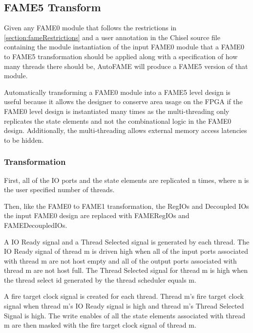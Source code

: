 \subsection{FAME5 Transform}
Given any FAME0 module that follows the restrictions in \ref{section:fameRestrictions} and a user annotation in the Chisel source file containing the module instantiation of the input FAME0 module that a FAME0 to FAME5 transformation should be applied along with a specification of how many threads there should be, AutoFAME will produce a FAME5 version of that module.

Automatically transforming a FAME0 module into a FAME5 level design is useful because it allows the designer to conserve area usage on the FPGA if the FAME0 level design is instantiated many times as the multi-threading only replicates the state elements and not the combinational logic in the FAME0 design. Additionally, the multi-threading allows external memory access latencies to be hidden.

\subsubsection{Transformation}
First, all of the IO ports and the state elements are replicated n times, where n is the user specified number of threads.

Then, like the FAME0 to FAME1 transformation, the RegIOs and Decoupled IOs the input FAME0 design are replaced with FAMERegIOs and FAMEDecoupledIOs.

A IO Ready signal and a Thread Selected signal is generated by each thread. The IO Ready signal of thread m is driven high when all of the input ports associated with thread m are not host empty and all of the output ports associated with thread m are not host full. The Thread Selected signal for thread m is high when the thread select id generated by the thread scheduler equals m.

A fire target clock signal is created for each thread. Thread m's fire target clock signal when thread m's IO Ready signal is high and thread m's Thread Selected Signal is high. The write enables of all the state elements associated with thread m are then masked with the fire target clock signal of thread m.


